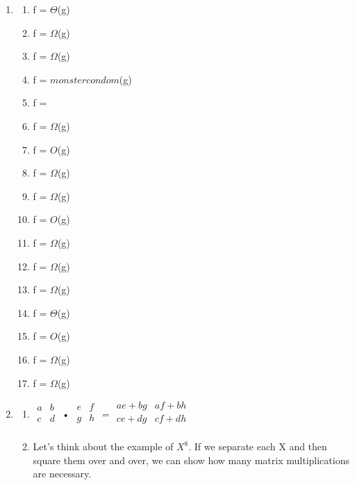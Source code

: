 \documentclass[12pt,letterpaper]{article}
\begin{document}
    \begin{enumerate}
    \item
      \begin{enumerate}
      \item f = \(\Theta\)(g)
      \item f = \(\Omega\)(g)
      \item f = \(\Omega\)(g)
      \item f = \(monster condom\)(g)
      \item f = 
      \item f = \(\Omega\)(g)
      \item f = \(O\)(g)
      \item f = \(\Omega\)(g)
      \item f = \(\Omega\)(g)
      \item f = \(O\)(g)
      \item f = \(\Omega\)(g)
      \item f = \(\Omega\)(g)
      \item f = \(\Omega\)(g)
      \item f = \(\Theta\)(g)
      \item f = \(O\)(g)
      \item f = \(\Omega\)(g)
      \item f = \(\Omega\)(g)
      \end{enumerate}
    \item
      \begin{enumerate}
      \item
        $
        \begin{array}{cc}
        a & b \\
        c & d \\
        \end{array}$
        •
        $
        \begin{array}{cc}
        e & f \\
        g & h \\
        \end{array}$
        =
        $
        \begin{array}{cc}
        ae + bg & af + bh \\
        ce + dg & cf + dh \\
        \end{array}$
      \item
        Let's think about the example of $X^8$. If we separate each X and then 			square them over and over, we can show how many matrix multiplications 			are necessary.
        \newline

\end{enumerate}
\end{enumerate}
\end{document}
